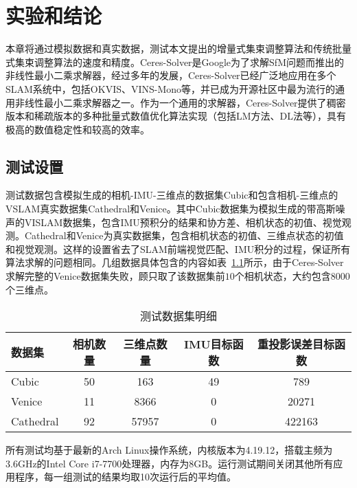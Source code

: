 \chapter{实验和结论}\label{ch:exp}

本章将通过模拟数据和真实数据，测试本文提出的增量式集束调整算法和传统批量式集束调整算法的速度和精度。Ceres-Solver是Google为了求解SfM问题而推出的非线性最小二乘求解器，经过多年的发展，Ceres-Solver已经广泛地应用在多个SLAM系统中，包括OKVIS、VINS-Mono等，并已成为开源社区中最为流行的通用非线性最小二乘求解器之一。作为一个通用的求解器，Ceres-Solver提供了稠密版本和稀疏版本的多种批量式数值优化算法实现（包括LM方法、DL法等），具有极高的数值稳定性和较高的效率。

\section{测试设置}

测试数据包含模拟生成的相机-IMU-三维点的数据集Cubic和包含相机-三维点的VSLAM真实数据集Cathedral\citep{kim2014influence}和Venice\citep{kummerle2011g}。其中Cubic数据集为模拟生成的带高斯噪声的VISLAM数据集，包含IMU预积分的结果和协方差、相机状态的初值、视觉观测。Cathedral和Venice为真实数据集，包含相机状态的初值、三维点状态的初值和视觉观测。这样的设置省去了SLAM前端视觉匹配、IMU积分的过程，保证所有算法求解的问题相同。几组数据具体包含的内容如表~\ref{tab:dataset}所示，由于Ceres-Solver求解完整的Venice数据集失败，顾只取了该数据集前$10$个相机状态，大约包含$8000$个三维点。

{
\linespread{1}
\begin{table}[htb!]
\caption{测试数据集明细}
\label{tab:dataset}
\centering
\begin{tabular}{l|cccc}
    \toprule
    数据集    & 相机数量 & 三维点数量 & IMU目标函数 & 重投影误差目标函数 \\ \midrule
    Cubic     &       50 &        163 &          49 &                789 \\
    Venice    &       11 &       8366 &           0 &              20271 \\
    Cathedral &       92 &      57957 &           0 &             422163 \\
    \bottomrule
\end{tabular}
\end{table}
}

所有测试均基于最新的Arch Linux操作系统，内核版本为4.19.12，搭载主频为3.6GHz的Intel Core i7-7700处理器，内存为8GB。运行测试期间关闭其他所有应用程序，每一组测试的结果均取10次运行后的平均值。

